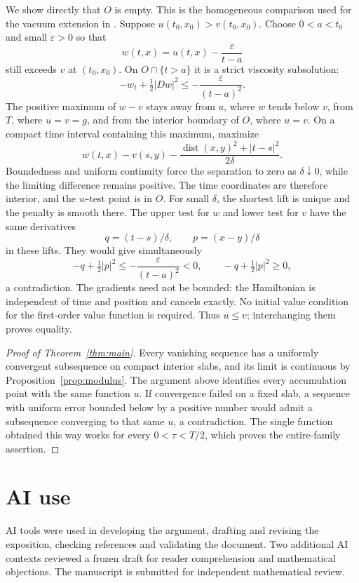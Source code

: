 \documentclass[11pt]{article}
\numberwithin{equation}{section}
\begin{document}
We show directly that \(O\) is empty. This is the homogeneous comparison
used for the vacuum extension in \cite[proof of Theorem~4.2]{Cardaliaguet}.
Suppose \(u(t_0,x_0)>v(t_0,x_0)\). Choose \(0<a<t_0\) and small
\(\varepsilon>0\) so that
\[
 w(t,x)=u(t,x)-\frac{\varepsilon}{t-a}
\]
still exceeds \(v\) at \((t_0,x_0)\).
On \(O\cap\{t>a\}\) it is a strict viscosity subsolution:
\[
 -w_t+\tfrac12|Dw|^2\le-\frac{\varepsilon}{(t-a)^2}.
\]
The positive maximum of \(w-v\) stays away from \(a\), where \(w\)
tends below \(v\), from \(T\), where \(u=v=g\), and from the
interior boundary of \(O\), where \(u=v\).
On a compact time interval containing this maximum, maximize
\[
 w(t,x)-v(s,y)
 -\frac{\operatorname{dist}(x,y)^2+|t-s|^2}{2\delta}.
\]
Boundedness and uniform continuity force the separation to zero as
\(\delta\downarrow0\), while the limiting difference remains positive.
The time coordinates are therefore interior, and the \(w\)-test point
is in \(O\). For small \(\delta\), the shortest lift is unique and the
penalty is smooth there. The upper test for \(w\) and lower test for
\(v\) have the same derivatives
\[
 q=(t-s)/\delta,\qquad p=(x-y)/\delta
\]
in these lifts. They would give simultaneously
\[
 -q+\tfrac12|p|^2\le-\frac{\varepsilon}{(t-a)^2}<0,
 \qquad -q+\tfrac12|p|^2\ge0 ,
\]
a contradiction. The gradients need not be bounded: the Hamiltonian
is independent of time and position and cancels exactly.
No initial value condition for the first-order value function is
required. Thus \(u\le v\); interchanging them proves equality.

\begin{proof}[Proof of Theorem~\ref{thm:main}]
Every vanishing sequence has a uniformly convergent subsequence on
compact interior slabs, and its limit is continuous by
Proposition~\ref{prop:modulus}. The argument above identifies every
accumulation point with the same function \(u\). If convergence failed
on a fixed slab, a sequence with uniform error bounded below by a
positive number would admit a subsequence converging to that same \(u\),
a contradiction. The single function obtained this way works for every
\(0<\tau<T/2\), which proves the entire-family assertion.
\end{proof}

\section*{AI use}
AI tools were used in developing the argument, drafting and revising the
exposition, checking references and validating the document. Two additional
AI contexts reviewed a frozen draft for reader comprehension and mathematical
objections. The manuscript is submitted for independent mathematical review.
\end{document}
